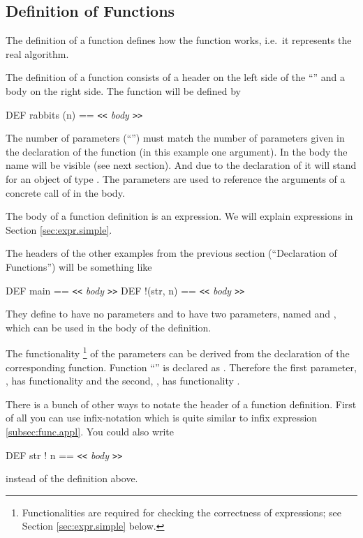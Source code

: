\subsection{Definition of Functions}
\label{sec:fun.def}
\novice
The definition of a function defines how the function works, i.e.~it
represents the real algorithm.

The definition of a function consists of a header on the left side of
the ``\pro{==}'' and a body on the right side. The function
 will be defined by
\begin{prog}
        DEF rabbits (n) == {\em \verb+<<+ body \verb+>>+\/}
\end{prog}

The number of parameters (``'') must match the number of
parameters given in the declaration of the function (in this example
one argument). 
In the body the name  will be visible (see next section). 
And due to the declaration of  it will stand for an
object of type .
The parameters are used to reference  the arguments of a concrete call
of  in the body. 

The body of a function definition is an expression. We will explain
expressions in Section \ref{sec:expr.simple}.

The headers of the other examples from the previous section
(``Declaration of Functions'') will be something like
\begin{prog}
        DEF main == {\em \verb+<<+ body \verb+>>+\/}
        DEF !(str, n) == {\em \verb+<<+ body \verb+>>+\/}
\end{prog}

They define  to have no parameters and \pro{!} to have two
parameters, named  and , which can be used in the body
of the definition.
\medskip

The functionality%
\footnote{Functionalities are required for checking
  the correctness of expressions; see Section \ref{sec:expr.simple}
  below.}
of the parameters can be derived from the declaration of the
corresponding function.
Function ``\pro{!}'' is declared as .
Therefore the first parameter, , has functionality 
and the second, , has functionality .
\medskip

\advanced There is a bunch of other ways to notate the header
of a function definition. First of all you can use infix-notation
which is quite similar to infix expression \ref{subsec:func.appl}. 
You could  also write
\begin{prog}
          DEF str ! n == {\em \verb+<<+ body \verb+>>+\/}
\end{prog}
\noindent instead of the definition above.


